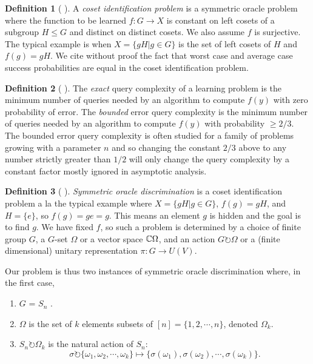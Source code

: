 \documentclass[12pt,twoside]{reedthesis}
\theoremstyle{plain}   %
\theoremstyle{definition}
\newtheorem{defn}{Definition}[section]
\theoremstyle{remark}
\numberwithin{equation}{section}
\def\acts{\circlearrowright} %
\begin{document}
  \begin{defn}[{ \cite[Section 2]{copeland} }]
    A \emph{coset identification problem} is a symmetric oracle problem where
    the function to be learned $f: G \to X$ is constant on left cosets of a subgroup $H \leq G$ and distinct on distinct cosets.
    We also assume $f$ is surjective.
    The typical example is when $X = \{gH | g \in G\}$ is the set of left cosets of $H$ and $f(g) = gH$.
    We cite without proof the fact that worst case and average case success probabilities are equal in the coset identification problem.
  \end{defn}
  \begin{defn}[{ \cite[Section 2]{copeland} }]
    The \emph{exact}
    query complexity of a learning problem is the minimum number of queries needed by an algorithm
    to compute $f (y)$ with zero probability of error. The \emph{bounded} error query complexity is the minimum
    number of queries needed by an algorithm to compute $f (y)$ with probability $\geq 2/3$. The bounded
    error query complexity is often studied for a family of problems growing with a parameter $n$ and
    so changing the constant $2/3$ above to any number strictly greater than $1/2$ will only change the
    query complexity by a constant factor mostly ignored in asymptotic analysis.
  \end{defn}
  \begin{defn}[{ \cite[Section 4]{copeland} }]
    \emph{Symmetric oracle discrimination} is a coset identification problem a la the typical example where $X = \{gH | g \in G\}$, $f(g) = gH$, and $H = \{e\}$, so $f(g) = g e = g$.
    This means an element $g$ is hidden and the goal is to find $g$.
    We have fixed $f$, so such a problem is determined by a choice of finite group $G$, a $G$-set $\Omega$ or a vector space $\mathbb{C} \Omega$, and an action $G \acts \Omega$ or a (finite dimensional) unitary representation $\pi: G \to U(V)$.
  \end{defn}
  Our problem is thus two instances of symmetric oracle discrimination where, in the first case,
  \begin{enumerate}
  \item $G$ = $S_n$ .
  \item $\Omega$ is the set of $k$ elements subsets of $[n] = \{ 1, 2, \cdots, n\}$, denoted $\Omega_k$.
  \item $S_n \acts \Omega_k$ is the natural action of $S_n$:
    \[\sigma \acts \{ \omega_1, \omega_2, \cdots, \omega_k \} \mapsto \{ \sigma(\omega_1), \sigma(\omega_2), \cdots, \sigma(\omega_k)\}.\]
  \end{enumerate}
\end{document}
